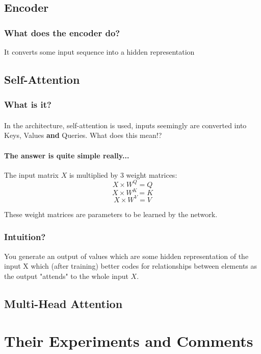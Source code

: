 \documentclass{article}
\begin{document}
    \subsection{Encoder}
    \subsubsection{What does the encoder do?}
    It converts some input sequence into a hidden representation 

    \subsection{Self-Attention}
    \subsubsection{What is it?}

    \paragraph{} In the architecture, self-attention is used, inputs seemingly are converted into Keys, Values \textbf{and} Queries. What does this mean!?
    \paragraph{The answer is quite simple really...} The input matrix $X$ is multiplied by 3 weight matrices:
    \[ X \times W^Q = Q \]
    \[ X \times W^K = K \]
    \[ X \times W^V = V \]

    These weight matrices are parameters to be learned by the network.

    \subsubsection{Intuition?}
    You generate an output of values which are some hidden representation of the input X which (after training) better codes for relationships between elements as the output "attends" to the whole input $X$.

    \subsection{Multi-Head Attention}

    \section{Their Experiments and Comments}
\end{document}
